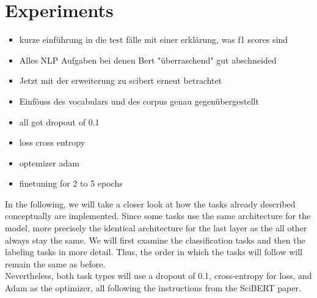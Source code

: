 \chapter{Experiments}
\label{chap:Experiments}
\color{ForestGreen}
\begin{itemize}
	\item kurze einführung in die test fälle mit einer erklärung, was f1 scores sind
	\item Alles NLP Aufgaben bei denen Bert "überraschend" gut abschneided
	\item Jetzt mit der erweiterung zu scibert erneut betrachtet
	\item Einföuss des vocabulars und des corpus genau gegenübergestellt
	\item all got dropout of 0.1
	\item loss cross entropy
	\item optemizer adam
	\item finetuning for 2 to 5 epochs 
\end{itemize}
\color{black}
In the following, we will take a closer look at how the tasks already described conceptually are implemented. Since some tasks use the same architecture for the model, more precisely the identical architecture for the last layer as the all other always stay the same. We will first examine the classification tasks and then the labeling tasks in more detail. Thus, the order in which the tasks will follow will remain the same as before.\\
Nevertheless, both task types will use a dropout of 0.1, cross-entropy for loss, and Adam as the optimizer, all following the instructions from the SciBERT paper.

